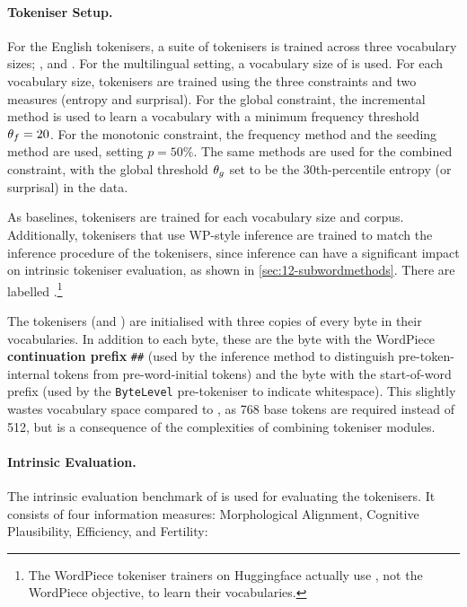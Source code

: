 \paragraph{Tokeniser Setup.} 
For the English tokenisers, a suite of tokenisers is trained across three vocabulary sizes; ,  and . For the multilingual setting, a vocabulary size of  is used. For each vocabulary size, tokenisers are trained using the three constraints and two measures (entropy and surprisal). For the global constraint, the incremental method is used to learn a vocabulary with a minimum frequency threshold $\theta_f = 20$. For the monotonic constraint, the frequency method and the seeding method are used, setting $p=50\%$. The same methods are used for the combined constraint, with the global threshold $\theta_g$ set to be the 30th-percentile entropy (or surprisal) in the data.

As baselines, \bpe tokenisers are trained for each vocabulary size and corpus. Additionally, \bpe tokenisers that use WP-style inference are trained to match the inference procedure of the \tokname tokenisers, since inference can have a significant impact on intrinsic tokeniser evaluation, as shown in \cref{sec:12-subwordmethods}. There are labelled \bpewp.\footnote{The WordPiece tokeniser trainers on Huggingface actually use \bpe, not the WordPiece objective, to learn their vocabularies.}

The \tokname tokenisers (and \bpewp) are initialised with three copies of every byte in their vocabularies. In addition to each byte, these are the byte with the WordPiece \textbf{continuation prefix} \texttt{\#\#} (used by the inference method to distinguish pre-token-internal tokens from pre-word-initial tokens) and the byte with the start-of-word prefix (used by the \texttt{ByteLevel} pre-tokeniser to indicate whitespace). This slightly wastes vocabulary space compared to \bpe, as 768 base tokens are required instead of 512, but is a consequence of the complexities of combining tokeniser modules.

\paragraph{Intrinsic Evaluation.} 

The intrinsic evaluation benchmark of \citet{uzan-etal-2024-greed} is used for evaluating the tokenisers. It consists of four information measures: Morphological Alignment, Cognitive Plausibility, \renyi Efficiency, and Fertility:

